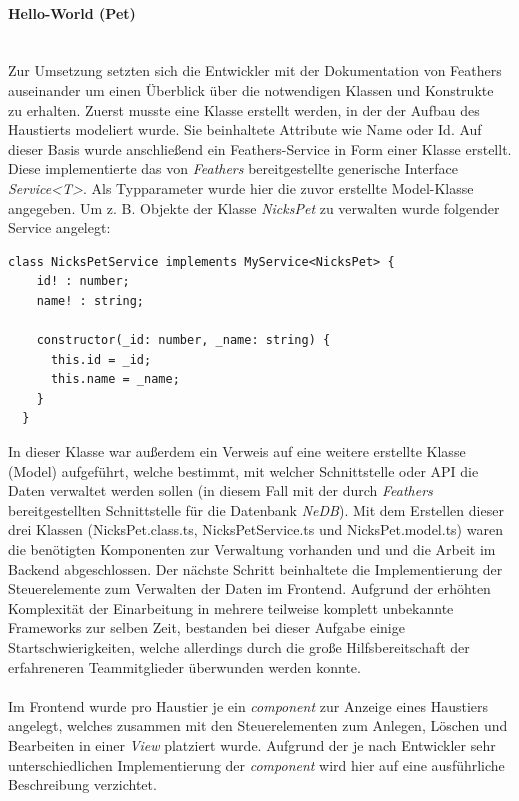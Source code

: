 \documentclass[10pt, a4paper]{article}
\begin{document}
\paragraph*{Hello-World (Pet)} $~$ \\
\label{HelloWorld}
Zur Umsetzung setzten sich die Entwickler mit der Dokumentation von Feathers auseinander um einen
Überblick über die notwendigen Klassen und Konstrukte zu erhalten. Zuerst musste eine Klasse erstellt werden, in der der Aufbau des Haustierts modeliert
wurde. Sie beinhaltete Attribute wie \glqq Name\grqq{} oder \glqq Id\grqq. Auf dieser Basis wurde anschließend ein Feathers-Service in Form einer
Klasse erstellt. Diese implementierte das von \textit{Feathers} bereitgestellte generische Interface \textit{Service<T>}. Als Typparameter wurde hier
die zuvor erstellte Model-Klasse angegeben. Um z. B. Objekte der Klasse \textit{NicksPet} zu verwalten wurde folgender Service angelegt:
\begin{lstlisting}[caption={NicksPetService (Hello World)}, captionpos=b]
  class NicksPetService implements MyService<NicksPet> {
    id! : number;
    name! : string;

    constructor(_id: number, _name: string) {
      this.id = _id;
      this.name = _name;
    }
  }
\end{lstlisting}
In dieser Klasse war außerdem ein Verweis auf eine weitere erstellte Klasse (Model) aufgeführt, welche bestimmt, mit welcher Schnittstelle oder API die Daten
verwaltet werden sollen (in diesem Fall mit der durch \textit{Feathers} bereitgestellten Schnittstelle für die Datenbank \textit{NeDB}).
Mit dem Erstellen dieser drei Klassen (NicksPet.class.ts, NicksPetService.ts und NicksPet.model.ts) waren die benötigten Komponenten zur Verwaltung vorhanden und
und die Arbeit im Backend abgeschlossen. Der nächste Schritt beinhaltete die Implementierung der Steuerelemente zum Verwalten der Daten im Frontend.
Aufgrund der erhöhten Komplexität der Einarbeitung in mehrere teilweise komplett unbekannte Frameworks zur selben Zeit, bestanden bei dieser Aufgabe
einige Startschwierigkeiten, welche allerdings durch die große Hilfsbereitschaft der erfahreneren Teammitglieder überwunden werden konnte.
\\~\\
Im Frontend wurde pro Haustier je ein \textit{component} zur Anzeige eines Haustiers angelegt,
welches zusammen mit den Steuerelementen zum Anlegen, Löschen und Bearbeiten in einer \textit{View} platziert wurde.
Aufgrund der je nach Entwickler sehr unterschiedlichen Implementierung der \textit{component} wird hier auf eine ausführliche Beschreibung verzichtet.
\end{document}
